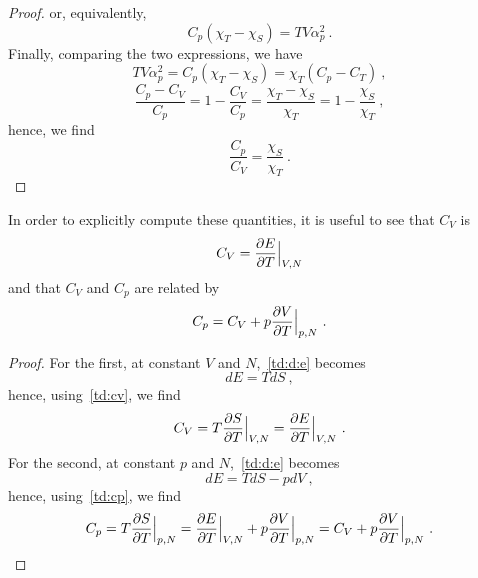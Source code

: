 \begin{proof}
        or, equivalently,
        \begin{equation*}
            C_p (\chi_T - \chi_S) = T V \alpha_p^2 ~.
        \end{equation*}
        Finally, comparing the two expressions, we have 
        \begin{equation*}
            T V \alpha_p^2 = C_p (\chi_T - \chi_S) = \chi_T (C_p - C_T) ~,
        \end{equation*}
        \begin{equation*}
            \frac{C_p - C_V}{C_p} = 1 - \frac{C_V}{C_p} = \frac{\chi_T - \chi_S}{\chi_T} = 1 - \frac{\chi_S}{\chi_T} ~,
        \end{equation*}
        hence, we find 
        \begin{equation*}
            \frac{C_p}{C_V} = \frac{\chi_S}{\chi_T} ~.
        \end{equation*}
    \end{proof}

    In order to explicitly compute these quantities, it is useful to see that $C_V$ is 
    \begin{equation}\label{td:cv2}
        C_V = \frac{\partial E}{\partial T} \Big \vert_{V, N}
    \end{equation}
    and that $C_V$ and $C_p$ are related by 
    \begin{equation}\label{td:cp2}
        C_p = C_V + p \frac{\partial V}{\partial T} \Big \vert_{p, N}~.
    \end{equation}
    \begin{proof}
        For the first, at constant $V$ and $N$,~\eqref{td:d:e} becomes 
        \begin{equation*}
            dE = T dS ~,
        \end{equation*}
        hence, using~\eqref{td:cv}, we find 
        \begin{equation*}
            C_V = T \frac{\partial S}{\partial T} \Big \vert_{V, N} = \frac{\partial E}{\partial T} \Big \vert_{V, N} ~.
        \end{equation*}
        For the second, at constant $p$ and $N$,~\eqref{td:d:e} becomes 
        \begin{equation*}
            dE = T dS - pdV ~,
        \end{equation*}
        hence, using~\eqref{td:cp}, we find 
        \begin{equation*}
            C_p = T \frac{\partial S}{\partial T} \Big \vert_{p, N} = \frac{\partial E}{\partial T} \Big \vert_{V, N} + p \frac{\partial V}{\partial T} \Big \vert_{p, N} = C_V + p \frac{\partial V}{\partial T} \Big \vert_{p, N} ~.
        \end{equation*}
    \end{proof}

